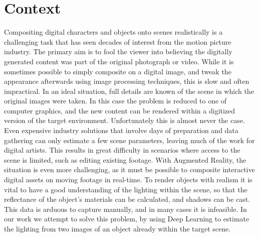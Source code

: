 \documentclass[ %
                    author={Gavin Parker},
                supervisor={Dr. Neill Campbell},
                    degree={MEng},
                     title={Deep Learning for Illumination Estimation from Stereo Images},
                  subtitle={},
                      type={Research},
                      year={2018} ]{dissertation}
\begin{document}
%

\mainmatter

\chapter{Context}
\label{chap:context}
Compositing digital characters and objects onto scenes realistically is a challenging task that has seen decades of interest from the motion picture industry. The primary aim is to fool the viewer into believing the digitally generated content was part of the original photograph or video. While it is sometimes possible to simply composite on a digital image, and tweak the appearance afterwards using image processing techniques, this is slow and often impractical. In an ideal situation, full details are known of the scene in which the original images were taken. In this case the problem is reduced to one of computer graphics, and the new content can be rendered within a digitized version of the target environment. Unfortunately this is almost never the case. Even expensive industry solutions that involve days of preparation and data gathering can only estimate a few scene parameters, leaving much of the work for digital artists. This results in great difficulty in scenarios where access to the scene is limited, such as editing existing footage. With Augmented Reality, the situation is even more challenging, as it must be possible to  composite interactive digital assets on moving footage in real-time.
\newline
To render objects with realism it is vital to have a good understanding of the lighting within the scene, so that the reflectance of the object's materials can be calculated, and shadows can be cast. This data is arduous to capture manually, and in many cases it is infeasible. In our work we attempt to solve this problem, by using Deep Learning to estimate the lighting from two images of an object already within the target scene.
\end{document}
